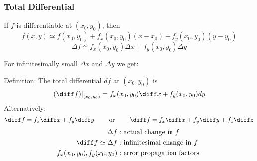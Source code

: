 
\begin{frame}
  \frametitle{Total Differential}

If $f$ is differentiable at $(x_0,y_0)$, then
%
$$f(x,y) \simeq f(x_0,y_0)+ f_x(x_0,y_0)(x-x_0) + f_y(x_0,y_0) (y-y_0)$$
%
$$\Delta f \simeq f_x(x_0,y_0) \Delta x + f_y(x_0,y_0) \Delta y$$

\pause For infinitesimally small $\Delta x$ and $\Delta y$ we get:

\underline{Definition}: The \textcolor[rgb]{0.98,0.00,0.00}{total differential} $df$ at $(x_0,y_0)$ is
%
$$\left. (\diff f) \right|_{(x_0,y_0)} = f_x(x_0,y_0) \diff x + f_y(x_0,y_0) dy$$
%
\pause Alternatively:
%
$$\diff f = f_x \diff x + f_y \diff y \qquad \text{ or } \qquad  \diff f = f_x \diff x + f_y \diff y + f_z \diff z$$
%
\begin{align*}
  \Delta f: & \text{ actual change in } f\\
  \diff f \simeq \Delta f: & \text{ infinitesimal change in } f\\
  f_x(x_0,y_0), f_y(x_0,y_0): & \text{ error propagation factors }
\end{align*}

\end{frame}
